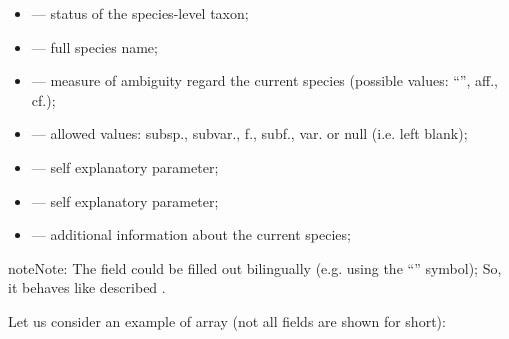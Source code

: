 \documentclass[letterpaper,10pt,english]{sphinxmanual}
\begin{document}
\begin{itemize}
\item {} 
 —  status of the species-level taxon;

\item {} 
 — full species name;

\item {} 
 — measure of ambiguity regard the current species (possible values: “”, aff., cf.);

\item {} 
 — allowed values:  subsp., subvar., f., subf., var. or null (i.e. left blank);

\item {} 
 — self explanatory parameter;

\item {} 
 — self explanatory parameter;

\item {} 
 — additional information about the current species;

\end{itemize}

\begin{sphinxadmonition}{note}{Note:}
The  field could be filled out bilingually (e.g. using the “\textbar{}” symbol);
So, it behaves like described {\hyperref[\detokenize{http_api:field-reference-label}]{}}.
\end{sphinxadmonition}


Let us consider an example of  array (not all fields are shown for short):
\end{document}
